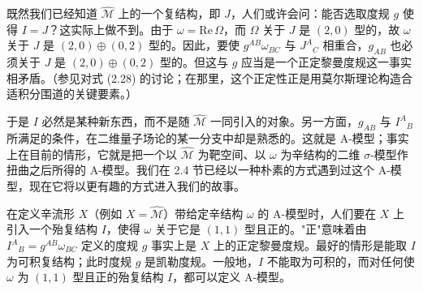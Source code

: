 \documentclass[11pt,a4paper,UTF8]{ctexart}
\theoremstyle{plain}
\theoremstyle{definition}
\begin{document}

既然我们已经知道 $\widehat{\mathcal{M}}$ 上的一个复结构，即 $J$，人们或许会问：能否选取度规 $g$ 使得 $I=J$？这实际上做不到。由于 $\omega=\mathrm{Re}\,\Omega$，而 $\Omega$ 关于 $J$ 是 $(2,0)$ 型的，故 $\omega$ 关于 $J$ 是 $(2,0)\oplus(0,2)$ 型的。因此，要使 $g^{AB}\omega_{BC}$ 与 $J^A{}_C$ 相重合，$g_{AB}$ 也必须关于 $J$ 是 $(2,0)\oplus(0,2)$ 型的。但这与 $g$ 应当是一个正定黎曼度规这一事实相矛盾。（参见对式 (2.28) 的讨论；在那里，这个正定性正是用莫尔斯理论构造合适积分围道的关键要素。）


于是 $I$ 必然是某种新东西，而不是随 $\widehat{\mathcal{M}}$ 一同引入的对象。另一方面，$g_{AB}$ 与 $I^A{}_B$ 所满足的条件，在二维量子场论的某一分支中却是熟悉的。这就是 A-模型；事实上在目前的情形，它就是把一个以 $\widehat{\mathcal{M}}$ 为靶空间、以 $\omega$ 为辛结构的二维 $\sigma$-模型作扭曲之后所得的 A-模型。我们在 2.4 节已经以一种朴素的方式遇到过这个 A-模型，现在它将以更有趣的方式进入我们的故事。

在定义辛流形 $X$（例如 $X=\widehat{\mathcal{M}}$）带给定辛结构 $\omega$ 的 A-模型时，人们要在 $X$ 上引入一个殆复结构 $I$，使得 $\omega$ 关于它是 $(1,1)$ 型且正的。"正"意味着由 $I^A{}_B=g^{AB}\omega_{BC}$ 定义的度规 $g$ 事实上是 $X$ 上的正定黎曼度规。最好的情形是能取 $I$ 为可积复结构；此时度规 $g$ 是凯勒度规。一般地，$I$ 不能取为可积的，而对任何使 $\omega$ 为 $(1,1)$ 型且正的殆复结构 $I$，都可以定义 A-模型。

\end{document}
